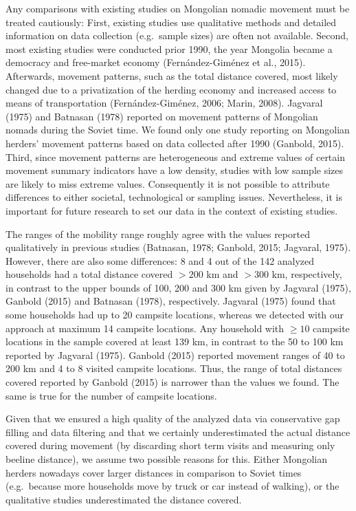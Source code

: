 \documentclass[]{elsarticle} %
\begin{document}
Any comparisons with existing studies on Mongolian nomadic movement must
be treated cautiously: First, existing studies use qualitative methods
and detailed information on data collection (e.g.~sample sizes) are
often not available. Second, most existing studies were conducted prior
1990, the year Mongolia became a democracy and free-market economy
(Fernández-Giménez et al., 2015). Afterwards, movement patterns, such as
the total distance covered, most likely changed due to a privatization
of the herding economy and increased access to means of transportation
(Fernández-Giménez, 2006; Marin, 2008). Jagvaral (1975) and Batnasan
(1978) reported on movement patterns of Mongolian nomads during the
Soviet time. We found only one study reporting on Mongolian herders'
movement patterns based on data collected after 1990 (Ganbold, 2015).
Third, since movement patterns are heterogeneous and extreme values of
certain movement summary indicators have a low density, studies with low
sample sizes are likely to miss extreme values. Consequently it is not
possible to attribute differences to either societal, technological or
sampling issues. Nevertheless, it is important for future research to
set our data in the context of existing studies.

The ranges of the mobility range roughly agree with the values reported
qualitatively in previous studies (Batnasan, 1978; Ganbold, 2015;
Jagvaral, 1975). However, there are also some differences: 8 and 4 out
of the 142 analyzed households had a total distance covered \(>200\) km
and \(>300\) km, respectively, in contrast to the upper bounds of 100,
200 and 300 km given by Jagvaral (1975), Ganbold (2015) and Batnasan
(1978), respectively. Jagvaral (1975) found that some households had up
to 20 campsite locations, whereas we detected with our approach at
maximum 14 campsite locations. Any household with \(\ge10\) campsite
locations in the sample covered at least 139 km, in contrast to the 50
to 100 km reported by Jagvaral (1975). Ganbold (2015) reported movement
ranges of 40 to 200 km and 4 to 8 visited campsite locations. Thus, the
range of total distances covered reported by Ganbold (2015) is narrower
than the values we found. The same is true for the number of campsite
locations.

Given that we ensured a high quality of the analyzed data via
conservative gap filling and data filtering and that we certainly
underestimated the actual distance covered during movement (by
discarding short term visits and measuring only beeline distance), we
assume two possible reasons for this. Either Mongolian herders nowadays
cover larger distances in comparison to Soviet times (e.g.~because more
households move by truck or car instead of walking), or the qualitative
studies underestimated the distance covered.
\end{document}

